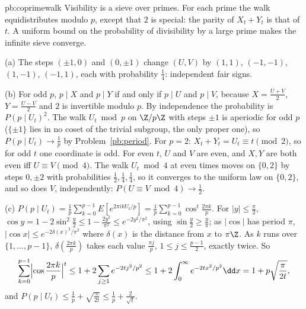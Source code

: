 \begin{solution}{pb:coprimewalk}
\idea Visibility is a sieve over primes. For each prime the walk equidistributes modulo $p$, except that $2$ is special: the parity of $X_t+Y_t$
is that of $t$. A uniform bound on the probability of divisibility by a large prime makes the infinite sieve converge.

\writeup (a) The steps $(\pm1,0)$ and $(0,\pm1)$ change $(U,V)$ by $(1,1)$, $(-1,-1)$, $(1,-1)$, $(-1,1)$, each with probability $\frac14$: independent fair signs.

(b) For odd $p$, $p\mid X$ and $p\mid Y$ if and only if $p\mid U$ and $p\mid V$, because $X=\frac{U+V}2$, $Y=\frac{U-V}2$ and $2$ is invertible modulo $p$. By independence the
probability is $P(p\mid U_t)^2$. The walk $U_t\bmod p$ on $\Z/p\Z$ with steps $\pm1$ is aperiodic for odd $p$ ($\{\pm1\}$ lies in no coset of the trivial subgroup, the only
proper one), so $P(p\mid U_t)\to\frac1p$ by Problem~\ref{pb:period}. For $p=2$: $X_t+Y_t=U_t\equiv t\pmod2$, so for odd $t$ one coordinate is odd. For even $t$, $U$ and $V$ are
even, and $X,Y$ are both even iff $U\equiv V\pmod4$. The walk $U_t\bmod4$ at even times moves on $\{0,2\}$ by steps $0,\pm2$ with probabilities
$\frac12,\frac14,\frac14$, so it converges to the uniform law on $\{0,2\}$, and so does $V$, independently: $P(U\equiv V\bmod4)\to\frac12$.

(c) $P(p\mid U_t)=\frac1p\sum_{k=0}^{p-1}E[e^{2\pi ikU_t/p}]=\frac1p\sum_{k=0}^{p-1}\cos^t\frac{2\pi k}p$. For $|y|\le\frac\pi2$, $\cos y=1-2\sin^2\frac y2\le1-\frac{2y^2}{\pi^2}\le e^{-2y^2/\pi^2}$, using $\sin\frac y2\ge\frac y\pi$; as $|\cos|$ has period
$\pi$, $|\cos x|\le e^{-2\delta(x)^2/\pi^2}$ where $\delta(x)$ is the distance from $x$ to $\pi\Z$. As $k$ runs over $\{1,\dots,p-1\}$, $\delta(\frac{2\pi k}p)$ takes each value $\frac{\pi j}p$, $1\le j\le\frac{p-1}2$, exactly
twice. So
\[
\sum_{k=0}^{p-1}\Bigl|\cos\frac{2\pi k}p\Bigr|^t\le1+2\sum_{j\ge1}e^{-2tj^2/p^2}\le1+2\int_0^\infty e^{-2tx^2/p^2}\dd x=1+p\sqrt{\frac\pi{2t}},
\]
and $P(p\mid U_t)\le\frac1p+\sqrt{\frac\pi{2t}}\le\frac1p+\frac2{\sqrt t}$.


\end{solution}
